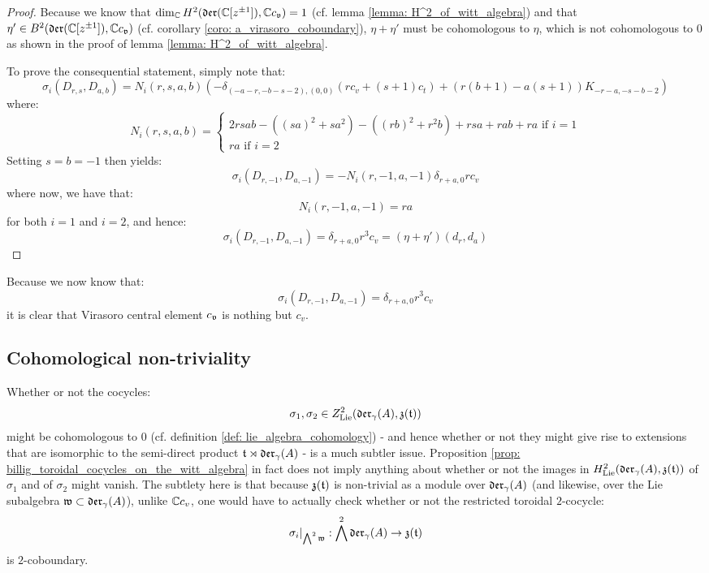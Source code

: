             \begin{proof}
                Because we know that $\dim_{\mathbb{C}} H^2(\mathfrak{der}(\mathbb{C}[z^{\pm 1}]), \mathbb{C} c_{\mathfrak{v}}) = 1$ (cf. lemma \ref{lemma: H^2_of_witt_algebra}) and that $\eta' \in B^2(\mathfrak{der}(\mathbb{C}[z^{\pm 1}]), \mathbb{C} c_{\mathfrak{v}})$ (cf. corollary \ref{coro: a_virasoro_coboundary}), $\eta + \eta'$ must be cohomologous to $\eta$, which is not cohomologous to $0$ as shown in the proof of lemma \ref{lemma: H^2_of_witt_algebra}.

                To prove the consequential statement, simply note that:
                    $$\sigma_i(D_{r, s}, D_{a, b}) = N_i(r, s, a, b) \left( -\delta_{ (-a - r, -b - s - 2), (0, 0) } (r c_v + (s + 1) c_t) + ( r(b + 1) - a(s + 1) )K_{-r - a, -s - b - 2} \right)$$
                where:
                    $$
                        N_i(r, s, a, b) =
                        \begin{cases}
                            \text{$2 rsab - ( (sa)^2 + s a^2 ) - ( (rb)^2 + r^2 b ) + rsa + rab + ra$ if $i = 1$}
                            \\
                            \text{$ra$ if $i = 2$}
                        \end{cases}
                    $$
                Setting $s = b = -1$ then yields:
                    $$\sigma_i(D_{r, -1}, D_{a, -1}) = -N_i(r, -1, a, -1) \delta_{r + a, 0} r c_v$$
                where now, we have that:
                    $$N_i(r, -1, a, -1) = ra$$
                for both $i = 1$ and $i = 2$, and hence:
                    $$\sigma_i(D_{r, -1}, D_{a, -1}) = \delta_{r + a, 0} r^3 c_v = (\eta + \eta')(d_r, d_a)$$
            \end{proof}
        \begin{remark}
            Because we now know that:
                $$\sigma_i(D_{r, -1}, D_{a, -1}) = \delta_{r + a, 0} r^3 c_v$$
            it is clear that  Virasoro central element $c_{\mathfrak{v}}$ is nothing but $c_v$.
        \end{remark}

    \subsection{Cohomological non-triviality}
        Whether or not the cocycles:
            $$\sigma_1, \sigma_2 \in Z^2_{\mathrm{Lie}}(\mathfrak{der}_{\gamma}(A), \mathfrak{z}(\mathfrak{t}))$$
        might be cohomologous to $0$ (cf. definition \ref{def: lie_algebra_cohomology}) - and hence whether or not they might give rise to extensions that are isomorphic to the semi-direct product $\mathfrak{t} \rtimes \mathfrak{der}_{\gamma}(A)$ - is a much subtler issue. Proposition \ref{prop: billig_toroidal_cocycles_on_the_witt_algebra} in fact does not imply anything about whether or not the images in $H^2_{\mathrm{Lie}}(\mathfrak{der}_{\gamma}(A), \mathfrak{z}(\mathfrak{t}))$ of $\sigma_1$ and of $\sigma_2$ might vanish. The subtlety here is that because $\mathfrak{z}(\mathfrak{t})$ is non-trivial as a module over $\mathfrak{der}_{\gamma}(A)$ (and likewise, over the Lie subalgebra $\mathfrak{w} \subset \mathfrak{der}_{\gamma}(A)$), unlike $\mathbb{C} c_v$, one would have to actually check whether or not the restricted toroidal $2$-cocycle:
            $$\sigma_i|_{\bigwedge^2 \mathfrak{w}}: \bigwedge^2 \mathfrak{der}_{\gamma}(A) \to \mathfrak{z}(\mathfrak{t})$$
        is $2$-coboundary.

